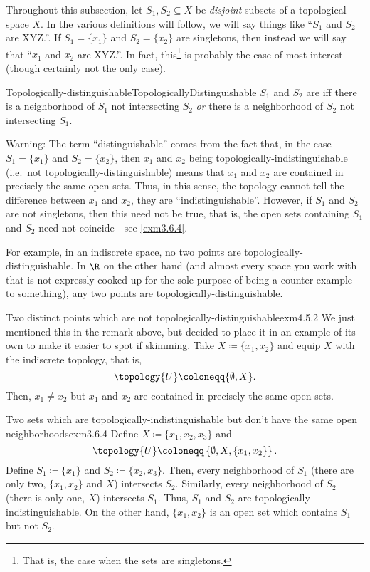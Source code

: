 Throughout this subsection, let $S_1,S_2\subseteq X$ be \emph{disjoint} subsets of a topological space $X$.  In the various definitions will follow, we will say things like ``$S_1$ and $S_2$ are XYZ.''.  If $S_1=\{ x_1\}$ and $S_2=\{ x_2\}$ are singletons, then instead we will say that ``$x_1$ and $x_2$ are XYZ.''.  In fact, this\footnote{That is, the case when the sets are singletons.} is probably the case of most interest (though certainly not the only case).
\begin{dfn}{Topologically-distinguishable\hfill}{TopologicallyDistinguishable}
$S_1$ and $S_2$ are  iff there is a neighborhood of $S_1$ not intersecting $S_2$ \emph{or} there is a neighborhood of $S_2$ not intersecting $S_1$.
\begin{wrn}
Warning:  The term ``distinguishable'' comes from the fact that, in the case $S_1=\{ x_1\}$ and $S_2=\{ x_2\}$, then $x_1$ and $x_2$ being topologically-indistinguishable (i.e.~not topologically-distinguishable) means that $x_1$ and $x_2$ are contained in precisely the same open sets.  Thus, in this sense, the topology cannot tell the difference between $x_1$ and $x_2$, they are ``indistinguishable''.  However, if $S_1$ and $S_2$ are not singletons, then this need not be true, that is, the open sets containing $S_1$ and $S_2$ need not coincide---see \cref{exm3.6.4}.
\end{wrn}
\begin{rmk}
For example, in an indiscrete space, no two points are topologically-distinguishable.  In $\R$ on the other hand (and almost every space you work with that is not expressly cooked-up for the sole purpose of being a counter-example to something), any two points are topologically-distinguishable.
\end{rmk}
\end{dfn}
\begin{exm}{Two distinct points which are not top\-ologically-distinguishable}{exm4.5.2}
We just mentioned this in the remark above, but decided to place it in an example of its own to make it easier to spot if skimming.  Take $X\coloneqq \{ x_1,x_2\}$ and equip $X$ with the indiscrete topology, that is,
\begin{equation}
\topology{U}\coloneqq \{ \emptyset ,X\} .
\end{equation}
Then, $x_1\neq x_2$ but $x_1$ and $x_2$ are contained in precisely the same open sets.
\end{exm}
\begin{exm}{Two sets which are topo\-logically-indistinguish\-able but don't have the same open neighborhoods}{exm3.6.4}
Define $X\coloneqq \{ x_1,x_2,x_3\}$ and
\begin{equation}
\topology{U}\coloneqq \left\{ \emptyset ,X,\{ x_1,x_2\} \right\} .
\end{equation}
Define $S_1\coloneqq \{ x_1\}$ and $S_2\coloneqq \{ x_2,x_3\}$.  Then, every neighborhood of $S_1$ (there are only two, $\{ x_1,x_2\}$ and $X$) intersects $S_2$.  Similarly, every neighborhood of $S_2$ (there is only one, $X$) intersects $S_1$.  Thus, $S_1$ and $S_2$ are topologically-indistinguishable.  On the other hand, $\{ x_1,x_2\}$ is an open set which contains $S_1$ but not $S_2$.
\end{exm}
